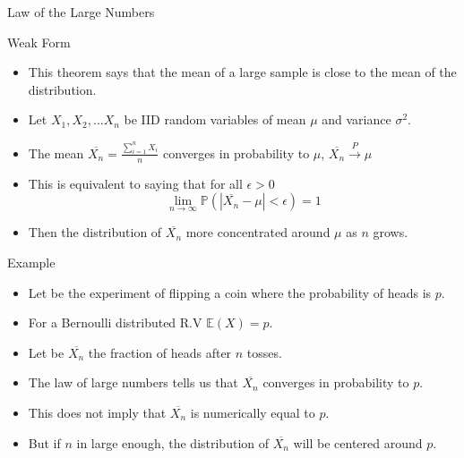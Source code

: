 \documentclass[handout]{beamer}
\begin{document}
\begin{frame}{Law of the Large Numbers}
\scriptsize{
\begin{block}{Weak Form}
\begin{itemize}
\item This theorem says that the mean of a large sample is close to the mean of the distribution.
 \item Let $X_{1},X_{2},\dots X_{n}$ be IID random variables of mean $\mu$ and variance $\sigma^2$.
 \item The mean $\overline{X_{n}} =\frac{\sum_{i=1}^{n}X_{i}}{n}$ converges in probability to $\mu$, $\overline{X_{n}} \overset{P}{\rightarrow} \mu$   
 \item This is equivalent to saying that for all $\epsilon > 0$
 \begin{displaymath}
  \lim_{n\rightarrow \infty} \mathbb{P}(|\overline{X_{n}} - \mu| < \epsilon)=1
 \end{displaymath}
\item Then the distribution of  $\overline{X_{n}}$ more
concentrated around $\mu$ as $n$ grows.
\end{itemize}
\end{block}
\begin{block}{Example}
\begin{itemize}
 \item Let be the experiment of flipping a coin where the probability of heads is $p$.
 \item For a Bernoulli distributed R.V $\mathbb{E}(X)=p$.
 \item Let be $\overline{X_{n}}$ the fraction of heads after $n$ tosses.
 \item The law of large numbers tells us that  $\overline{X_{n}}$ converges in probability to $p$.
 \item This does not imply that  $\overline{X_{n}}$ is numerically equal to $p$.
 \item  But if $n$ in large enough, the distribution of $\overline{X_{n}}$ will be centered around $p$.
\end{itemize}

 
\end{block}



}
 
\end{frame}
\end{document}
